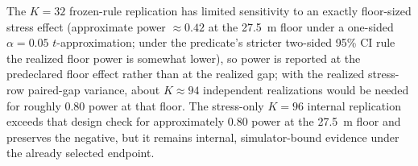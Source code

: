 \documentclass{article}
\begin{document}


The $K=32$ frozen-rule replication has limited sensitivity to an exactly floor-sized stress effect (approximate power $\approx0.42$ at the 27.5~m floor under a one-sided $\alpha=0.05$ $t$-approximation; under the predicate's stricter two-sided 95\% CI rule the realized floor power is somewhat lower), so power is reported at the predeclared floor effect rather than at the realized gap; with the realized stress-row paired-gap variance, about $K\approx94$ independent realizations would be needed for roughly 0.80 power at that floor. The stress-only $K=96$ internal replication exceeds that design check for approximately 0.80 power at the 27.5~m floor and preserves the negative, but it remains internal, simulator-bound evidence under the already selected endpoint.
\end{document}

